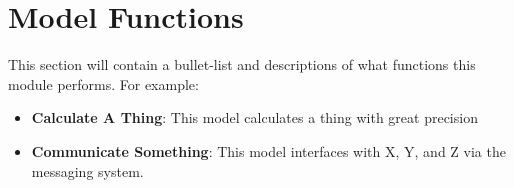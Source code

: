 

\section{Model Functions}
This section will contain a bullet-list and descriptions of what functions this module performs. For example:
\begin{itemize}
	\item \textbf{Calculate A Thing}: This model calculates a thing with great precision
	\item \textbf{Communicate Something}: This model interfaces with X, Y, and Z via the messaging system.
\end{itemize}